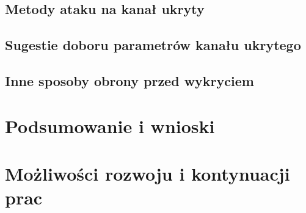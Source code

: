 \documentclass[a4paper, twoside]{report}
\begin{document}
    \section{Metody ataku na kanał ukryty}
    \section{Sugestie doboru parametrów kanału ukrytego}
    \section{Inne sposoby obrony przed wykryciem}

\chapter{Podsumowanie i wnioski}
\chapter{Możliwości rozwoju i kontynuacji prac}

\clearpage
{}


\end{document}
